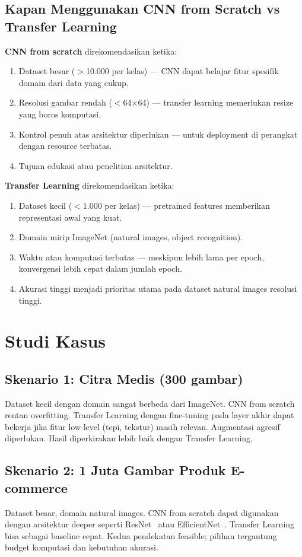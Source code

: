 \documentclass[conference]{IEEEtran}
\begin{document}
\subsection{Kapan Menggunakan CNN from Scratch vs Transfer Learning}
\textbf{CNN from scratch} direkomendasikan ketika:
\begin{enumerate}
\item Dataset besar ($>$10.000 per kelas) — CNN dapat belajar fitur spesifik domain dari data yang cukup.
\item Resolusi gambar rendah ($<$64$\times$64) — transfer learning memerlukan resize yang boros komputasi.
\item Kontrol penuh atas arsitektur diperlukan — untuk deployment di perangkat dengan resource terbatas.
\item Tujuan edukasi atau penelitian arsitektur.
\end{enumerate}

\textbf{Transfer Learning} direkomendasikan ketika:
\begin{enumerate}
\item Dataset kecil ($<$1.000 per kelas) — pretrained features memberikan representasi awal yang kuat.
\item Domain mirip ImageNet (natural images, object recognition).
\item Waktu atau komputasi terbatas — meskipun lebih lama per epoch, konvergensi lebih cepat dalam jumlah epoch.
\item Akurasi tinggi menjadi prioritas utama pada dataset natural images resolusi tinggi.
\end{enumerate}

\section{Studi Kasus}
\subsection{Skenario 1: Citra Medis (300 gambar)}
Dataset kecil dengan domain sangat berbeda dari ImageNet. CNN from scratch rentan overfitting. Transfer Learning dengan fine-tuning pada layer akhir dapat bekerja jika fitur low-level (tepi, tekstur) masih relevan. Augmentasi agresif diperlukan. Hasil diperkirakan lebih baik dengan Transfer Learning.

\subsection{Skenario 2: 1 Juta Gambar Produk E-commerce}
Dataset besar, domain natural images. CNN from scratch dapat digunakan dengan arsitektur deeper seperti ResNet~\cite{he2016} atau EfficientNet~\cite{tan2019}. Transfer Learning bisa sebagai baseline cepat. Kedua pendekatan feasible; pilihan tergantung budget komputasi dan kebutuhan akurasi.
\end{document}
